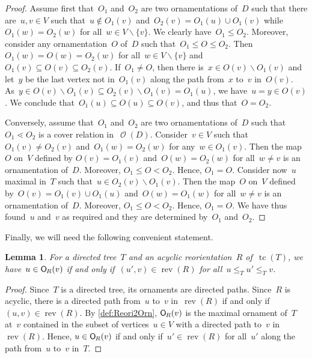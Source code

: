 \documentclass{amsart}
\newtheorem{lemma}[theorem]{Lemma}
\theoremstyle{definition}
\renewcommand{\c}[1]{\mathcal{#1}} %
\newcommand{\ssm}{\smallsetminus} %
\DeclareMathOperator{\tc}{tc} %
\newcommand{\mymap}[2]{\mathsf{#1}_{\hspace{-.7pt}#2}}
\DeclareMathOperator{\Orn}{\c{O}}  %
\newcommand{\orn}[1]{\mymap{O}{#1}}  %
\DeclareMathOperator{\rev}{rev} %
\begin{document}
\begin{proof}
Assume first that~$O_1$ and~$O_2$ are two ornamentations of~$D$ such that there are~$u, v \in V$ such that~$u \notin O_1(v)$ and~$O_2(v) = O_1(u) \cup O_1(v)$ while~$O_1(w) = O_2(w)$ for all~${w \in V \ssm \{v\}}$.
We clearly have~$O_1 \le O_2$.
Moreover, consider any ornamentation~$O$ of~$D$ such that~$O_1 \le O \le O_2$.
Then~$O_1(w) = O(w) = O_2(w)$ for all~${w \in V \ssm \{v\}}$ and~$O_1(v) \subseteq O(v) \subseteq O_2(v)$.
If~$O_1 \ne O$, then there is~$x \in O(v) \ssm O_1(v)$ and let~$y$ be the last vertex not in~$O_1(v)$ along the path from~$x$ to~$v$ in~$O(v)$.
As~$y \in O(v) \ssm O_1(v) \subseteq O_2(v) \ssm  O_1(v) = O_1(u)$, we have~$u = y \in O(v)$.
We conclude that~$O_1(u) \subseteq O(u) \subseteq O(v)$, and thus that~$O = O_2$.

Conversely, assume that~$O_1$ and~$O_2$ are two ornamentations of~$D$ such that~$O_1 \lessdot O_2$ is a cover relation in~$\Orn(D)$.
Consider~$v \in V$ such that~$O_1(v) \ne O_2(v)$ and~$O_1(w) = O_2(w)$ for any~$w \in O_1(v)$.
Then the map~$O$ on~$V$ defined by $O(v) = O_1(v)$ and~$O(w) = O_2(w)$ for all~$w \ne v$ is an ornamentation of~$D$. %
Moreover, $O_1 \le O < O_2$.
Hence, $O_1 = O$.
Consider now~$u$ maximal in~$T$ such that~$u \in O_2(v) \ssm O_1(v)$.
Then the map~$O$ on~$V$ defined by~$O(v) = O_1(v) \cup O_1(u)$ and~$O(w) = O_1(w)$ for all~$w \ne v$ is an ornamentation of~$D$.
Moreover, $O_1 \le O < O_2$.
Hence, $O_1 = O$.
We have thus found~$u$ and~$v$ as required and they are determined by~$O_1$ and~$O_2$.
\end{proof}

Finally, we will need the following convenient statement.

\begin{lemma}
\label{lem:Reori2OrnT}
For a directed tree~$T$ and an acyclic reorientation~$R$ of~$\tc(T)$, we have~$u \in \orn{R}(v)$ if and only if~$(u',v) \in \rev(R)$ for all~$u \le_T u' \le_T v$.
\end{lemma}

\begin{proof}
Since~$T$ is a directed tree, its ornaments are directed paths.
Since~$R$ is acyclic, there is a directed path from~$u$ to~$v$ in~$\rev(R)$ if and only if~$(u,v) \in \rev(R)$.
By \cref{def:Reori2Orn}, $\orn{R}(v)$ is the maximal ornament of~$T$ at~$v$ contained in the subset of vertices~$u \in V$ with a directed path to~$v$ in $\rev(R)$.
Hence, $u \in \orn{R}(v)$ if and only if~$u' \in \rev(R)$ for all~$u'$ along the path from~$u$ to~$v$ in~$T$.
\end{proof}
\end{document}
